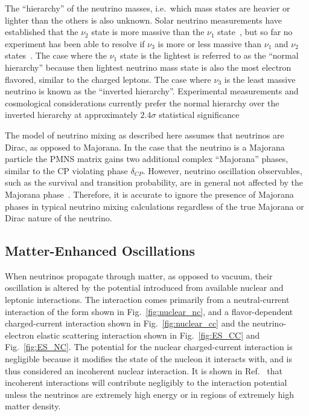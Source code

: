 The ``hierarchy'' of the neutrino masses, i.e.\ which
mass states are heavier or lighter than the others is also unknown.
Solar neutrino measurements have established that the $\nu_{2}$ state
is more massive than the $\nu_{1}$ state~\citep{sno_first, sno_combined}, but so far no experiment has been
able to resolve if $\nu_{3}$ is more or less massive than $\nu_{1}$ and $\nu_{2}$ states~\citep{vogel_hierarchy}.
The case where the $\nu_{1}$ state is the lightest is referred to as the
``normal hierarchy'' because then lightest neutrino mass state 
is also the most electron flavored, similar to the charged leptons.
The case where $\nu_{3}$ is the least massive neutrino is known as the
``inverted hierarchy''.
 Experimental measurements and cosmological considerations currently prefer
 the normal hierarchy over the inverted hierarchy at approximately $2.4\sigma$ statistical
 significance~\citep{nu_fit}

The model of neutrino mixing as described here assumes that neutrinos are Dirac, as opposed to
Majorana. In the case that the neutrino is a Majorana particle the PMNS matrix
gains two additional complex ``Majorana'' phases, similar to the CP violating
phase $\delta_{CP}$.
However, neutrino oscillation observables, such as the survival and transition
probability, are in general not affected by the Majorana phase~\citep{majorana_mixing}.
Therefore, it is accurate to ignore the presence of Majorana phases in typical 
neutrino mixing calculations regardless of the true Majorana or Dirac nature of the neutrino.

\subsection{Matter-Enhanced Oscillations}
When neutrinos propagate through matter, as opposed to vacuum, their oscillation is altered
by the potential introduced from available nuclear and leptonic interactions.
The interaction comes primarily from a neutral-current interaction of the form
shown in Fig.~\ref{fig:nuclear_nc}, and a flavor-dependent charged-current interaction shown in
Fig.~\ref{fig:nuclear_cc} and the  neutrino-electron elastic scattering interaction shown in
Fig.~\ref{fig:ES_CC} and Fig.~\ref{fig:ES_NC}.
The potential for the nuclear charged-current interaction is negligible
because it modifies the state of the nucleon it interacts with,
and is thus considered an incoherent nuclear interaction.
It is shown in Ref.~\citep{wolfenstein_osc} that incoherent interactions
will contribute negligibly to the interaction potential unless the neutrinos
are extremely high energy or in regions of extremely high matter density.


